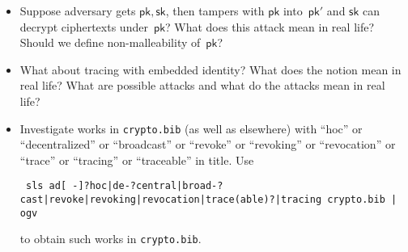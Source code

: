 \begin{itemize}
\item Suppose adversary gets $\mathsf{pk},\mathsf{sk}$, then tampers with $\mathsf{pk}$ into~$\mathsf{pk}'$ and $\mathsf{sk}$ can decrypt ciphertexts under~$\mathsf{pk}$?
What does this attack mean in real life?
Should we define non-malleability of~$\mathsf{pk}$?
\item What about tracing with embedded identity?
What does the notion mean in real life?
What are possible attacks and what do the attacks mean in real life?
\item Investigate works in \texttt{crypto.bib} (as well as elsewhere) with ``\ad hoc'' or ``decentralized'' or ``broadcast'' or ``revoke'' or ``revoking'' or ``revocation'' or ``trace'' or ``tracing'' or ``traceable'' in title. Use
\begin{center}\tiny\texttt{
sls {\textquotesingle}ad[ -]?hoc|de-?central|broad-?cast|revoke|revoking|revocation|trace(able)?|tracing{\textquotesingle} crypto.bib | ogv
}\end{center}
to obtain such works in \texttt{crypto.bib}.
\end{itemize}
